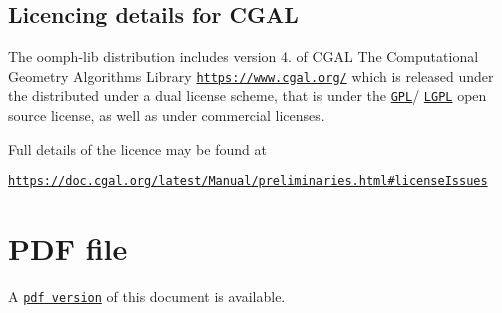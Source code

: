 \subsection*{Licencing details for C\+G\+AL}

The {\ttfamily oomph-\/lib} distribution includes version 4. of C\+G\+AL The Computational Geometry Algorithms Library \href{https://www.cgal.org/}{\tt https\+://www.\+cgal.\+org/} which is released under the distributed under a dual license scheme, that is under the \href{https://www.gnu.org/copyleft/gpl.html}{\tt G\+PL}/ \href{https://www.gnu.org/copyleft/lesser.html}{\tt L\+G\+PL} open source license, as well as under commercial licenses.

Full details of the licence may be found at \begin{center} \href{https://doc.cgal.org/latest/Manual/preliminaries.html#licenseIssues}{\tt https\+://doc.\+cgal.\+org/latest/\+Manual/preliminaries.\+html\#license\+Issues} \end{center} 







 

 \hypertarget{index_pdf}{}\section{P\+D\+F file}\label{index_pdf}
A \href{../latex/refman.pdf}{\tt pdf version} of this document is available. 
